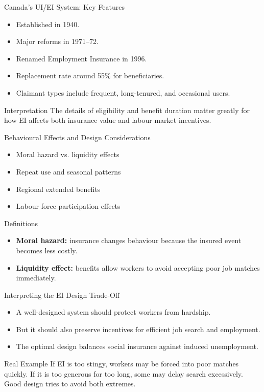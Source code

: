 \documentclass[aspectratio=169]{beamer}
\begin{document}
\begin{frame}{Canada's UI/EI System: Key Features}
\transfade
\begin{itemize}[<+->]
  \item Established in 1940.
  \item Major reforms in 1971--72.
  \item Renamed Employment Insurance in 1996.
  \item Replacement rate around 55\% for beneficiaries.
  \item Claimant types include frequent, long-tenured, and occasional users.
\end{itemize}

\begin{block}{Interpretation}
The details of eligibility and benefit duration matter greatly for how EI affects both insurance value and labour market incentives.
\end{block}
\end{frame}

\begin{frame}{Behavioural Effects and Design Considerations}
\transfade
\begin{itemize}[<+->]
  \item Moral hazard vs. liquidity effects
  \item Repeat use and seasonal patterns
  \item Regional extended benefits
  \item Labour force participation effects
\end{itemize}

\begin{block}{Definitions}
\begin{itemize}[<+->]
  \item \textbf{Moral hazard:} insurance changes behaviour because the insured event becomes less costly.
  \item \textbf{Liquidity effect:} benefits allow workers to avoid accepting poor job matches immediately.
\end{itemize}
\end{block}
\end{frame}

\begin{frame}{Interpreting the EI Design Trade-Off}
\transfade
\begin{itemize}[<+->]
  \item A well-designed system should protect workers from hardship.
  \item But it should also preserve incentives for efficient job search and employment.
  \item The optimal design balances social insurance against induced unemployment.
\end{itemize}

\begin{exampleblock}{Real Example}
If EI is too stingy, workers may be forced into poor matches quickly. If it is too generous for too long, some may delay search excessively. Good design tries to avoid both extremes.
\end{exampleblock}
\end{frame}
\end{document}
